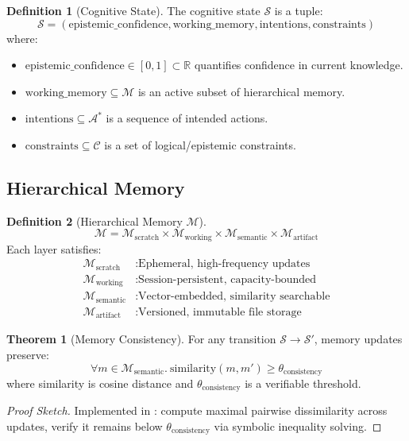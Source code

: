 \documentclass[12pt]{article}
\theoremstyle{definition}
\newtheorem{definition}{Definition}[section]
\newtheorem{theorem}{Theorem}[section]
\newcommand{\state}{\mathcal{S}}
\newcommand{\action}{\mathcal{A}}
\newcommand{\memory}{\mathcal{M}}
\newcommand{\consistency}{\mathcal{C}}
\newcommand{\sage}{\text{SageMath}}
\begin{document}
\begin{definition}[Cognitive State]
The cognitive state $\state$ is a tuple:
\[
\state = (\text{epistemic\_confidence}, \text{working\_memory}, \text{intentions}, \text{constraints})
\]
where:
\begin{itemize}
    \item $\text{epistemic\_confidence} \in [0,1] \subset \mathbb{R}$ quantifies confidence in current knowledge.
    \item $\text{working\_memory} \subseteq \memory$ is an active subset of hierarchical memory.
    \item $\text{intentions} \subseteq \action^*$ is a sequence of intended actions.
    \item $\text{constraints} \subseteq \consistency$ is a set of logical/epistemic constraints.
\end{itemize}
\end{definition}

\subsection{Hierarchical Memory}

\begin{definition}[Hierarchical Memory $\memory$]
\[
\memory = \memory_{\text{scratch}} \times \memory_{\text{working}} \times \memory_{\text{semantic}} \times \memory_{\text{artifact}}
\]
Each layer satisfies:
\begin{align*}
    \memory_{\text{scratch}} &: \text{Ephemeral, high-frequency updates} \\
    \memory_{\text{working}} &: \text{Session-persistent, capacity-bounded} \\
    \memory_{\text{semantic}} &: \text{Vector-embedded, similarity searchable} \\
    \memory_{\text{artifact}} &: \text{Versioned, immutable file storage}
\end{align*}
\end{definition}

\begin{theorem}[Memory Consistency]
For any transition $\state \to \state'$, memory updates preserve:
\[
\forall m \in \memory_{\text{semantic}}.\ \text{similarity}(m, m') \geq \theta_{\text{consistency}}
\]
where similarity is cosine distance and $\theta_{\text{consistency}}$ is a verifiable threshold.
\end{theorem}

\begin{proof}[Proof Sketch]
Implemented in \sage: compute maximal pairwise dissimilarity across updates, verify it remains below $\theta_{\text{consistency}}$ via symbolic inequality solving.
\end{proof}
\end{document}
